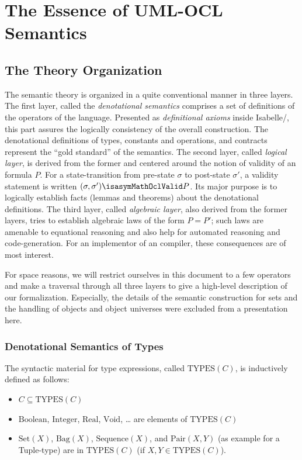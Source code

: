 \section{The Essence of UML-OCL Semantics}
\subsection{The Theory Organization}
The semantic theory is organized in a quite conventional manner in
three layers. The first layer, called the \emph{denotational
  semantics} comprises a set of definitions of the operators of the
language.  Presented as \emph{definitional axioms} inside
Isabelle/\HOL, this part assures the logically consistency of the
overall construction. The denotational definitions of types, constants
and operations, and \OCL contracts represent the ``gold standard'' of the
semantics. The second layer, called \emph{logical layer},
is derived from the former and centered around the notion of validity
of an \OCL formula $P$. For a state-transition from pre-state $\sigma$
to post-state $\sigma'$, a validity statement is written $(\sigma,
\sigma') \isasymMathOclValid P$. Its major purpose is to logically establish facts
(lemmas and theorems) about the denotational definitions.
The third layer, called \emph{algebraic layer},
also derived from the former layers, tries to establish algebraic laws
of the form $P = P'$; such laws are amenable to equational reasoning
and also help for automated reasoning and code-generation. For an
implementor of an \OCL compiler, these consequences are of most interest.

For space reasons, we will restrict ourselves in this document to a few
operators and make a traversal through all three layers to give a
high-level description of our formalization.  Especially, the details
of the semantic construction for sets and the handling of objects and
object universes were excluded from a presentation here.

\subsubsection{Denotational Semantics of Types}
The syntactic material for type expressions, called $\text{TYPES}(C)$, is 
inductively defined as follows:
\begin{itemize}
\item $C \subseteq \text{TYPES}(C)$
\item $\text{Boolean}$, $\text{Integer}$, $\text{Real}$, $\text{Void}$, \ldots
      are elements of $\text{TYPES}(C)$
\item $\text{Set}(X)$, $\text{Bag}(X)$, $\text{Sequence}(X)$,  and 
      $\text{Pair}(X,Y)$ (as example for a Tuple-type)
      are in  $\text{TYPES}(C)$ (if $X, Y \in \text{TYPES}(C)$).
\end{itemize}

